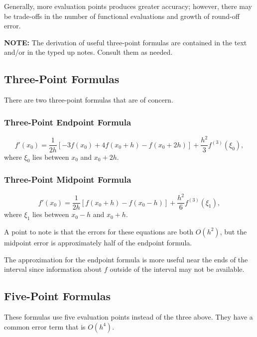 \documentclass[11pt]{article}
\begin{document}
Generally, more evaluation points produces greater accuracy; however,
there may be trade-offs in the number of functional evaluations and
growth of round-off error.

\textbf{NOTE:} The derivation of useful three-point formulas are
contained in the text and/or in the typed up notes. Consult them as
needed.

    \hypertarget{three-point-formulas}{%
\subsection{Three-Point Formulas}\label{three-point-formulas}}

There are two three-point formulas that are of concern.

\hypertarget{three-point-endpoint-formula}{%
\subsubsection{Three-Point Endpoint
Formula}\label{three-point-endpoint-formula}}

\[f'(x_0)=\frac{1}{2h}\left[-3f(x_0)+4f(x_0+h)-f(x_0+2h)\right]+\frac{h^2}{3}f^{(3)}(\xi_0),\]
where \(\xi_0\) lies between \(x_0\) and \(x_0+2h\).

\hypertarget{three-point-midpoint-formula}{%
\subsubsection{Three-Point Midpoint
Formula}\label{three-point-midpoint-formula}}

\[f'(x_0)=\frac{1}{2h}\left[f(x_0+h)-f(x_0-h)\right]+\frac{h^2}{6}f^{(3)}(\xi_1),\]
where \(\xi_1\) lies between \(x_0-h\) and \(x_0+h\).

A point to note is that the errors for these equations are both
\(O(h^2)\), but the midpoint error is approximately half of the endpoint
formula.

The approximation for the endpoint formula is more useful near the ends
of the interval since information about \(f\) outside of the interval
may not be available.

\hypertarget{five-point-formulas}{%
\subsection{Five-Point Formulas}\label{five-point-formulas}}

These formulas use five evaluation points instead of the three above.
They have a common error term that is \(O(h^4)\).
\end{document}
